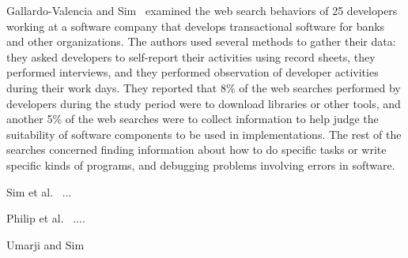 \documentclass{casicswhitepaper}
\begin{document}
Gallardo-Valencia and Sim~\cite{gallardo2011kinds} examined the web search behaviors of 25 developers working at a software company that develops transactional software for banks and other organizations.  The authors used several methods to gather their data: they asked developers to self-report their activities using record sheets, they performed interviews, and they performed observation of developer activities during their work days.  They reported that 8\% of the web searches performed by developers during the study period were to download libraries or other tools, and another 5\% of the web searches were to collect information to help judge the suitability of software components to be used in implementations.  The rest of the searches concerned finding information about how to do specific tasks or write specific kinds of programs, and debugging problems involving errors in software.

Sim et al.~\cite{sim_2011} ...

Philip et al.~\cite{philip2012software} ....

Umarji and Sim~\cite{umarij_2008, umarij_2013}
\end{document}
